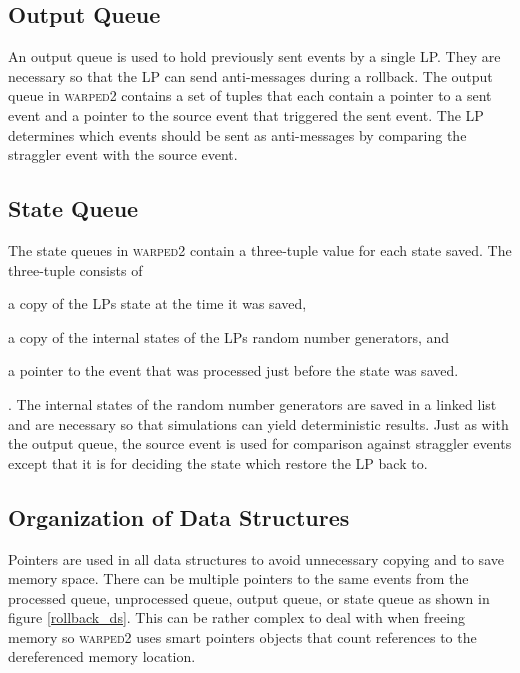 \documentclass[11pt]{book}
\begin{document}
\subsection{Output Queue}

An output queue is used to hold previously sent events by a single LP. They are necessary
so that the LP can send anti-messages during a rollback. The output queue in \textsc{warped2}
contains a set of tuples that each contain a pointer to a sent event and a pointer to the
source event that triggered the sent event. The LP determines which events should be sent
as anti-messages by comparing the straggler event with the source event.

\subsection{State Queue}

The state queues in \textsc{warped2} contain a three-tuple value for each state saved.
The three-tuple consists of \begin{inparaenum}[(1)] \item a copy of the LPs state at the
time it was saved, \item a copy of the internal states of the LPs random number generators,
and \item a pointer to the event that was processed just before the state was saved.
\end{inparaenum}. The internal states of the random number generators are saved in a linked
list and are necessary so that simulations can yield deterministic results. Just as with
the output queue, the source event is used for comparison against straggler events except
that it is for deciding the state which restore the LP back to.

\subsection{Organization of Data Structures}

Pointers are used in all data structures to avoid unnecessary copying and to save memory
space. There can be multiple pointers to the same events from the processed queue,
unprocessed queue, output queue, or state queue as shown in figure \ref{rollback_ds}. This
can be rather complex to deal with when freeing memory so \textsc{warped2} uses smart
pointers objects that count references to the dereferenced memory location.
\end{document}
